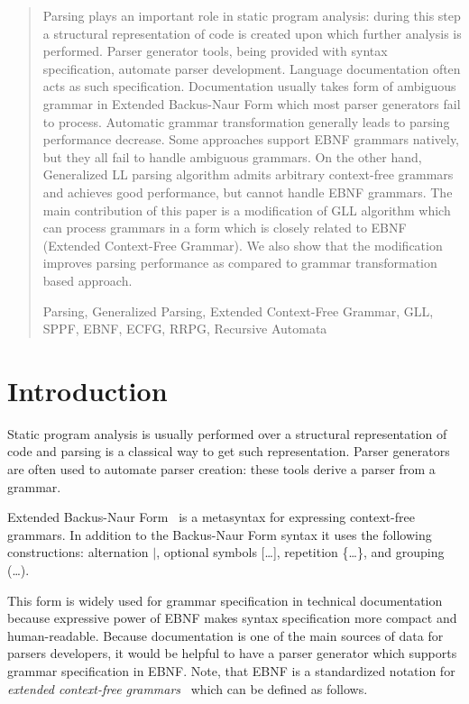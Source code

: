 \documentclass[runningheads,a4paper]{llncs}
\newcommand{\keywords}[1]{\par\addvspace\baselineskip
\noindent\keywordname\enspace\ignorespaces#1}
\begin{document}
\begin{abstract}
Parsing plays an important role in static program analysis: during this step a structural representation of code is created upon which further analysis is performed. 
Parser generator tools, being provided with syntax specification, automate parser development. 
Language documentation often acts as such specification. 
Documentation usually takes form of ambiguous grammar in Extended Backus-Naur Form which most parser generators fail to process. 
Automatic grammar transformation generally leads to parsing performance decrease. 
Some approaches support EBNF grammars natively, but they all fail to handle ambiguous grammars. 
On the other hand, Generalized LL parsing algorithm admits arbitrary context-free grammars and achieves good performance, but cannot handle EBNF grammars. 
The main contribution of this paper is a modification of GLL algorithm which can process grammars in a form which is closely related to EBNF (Extended Context-Free Grammar). 
We also show that the modification improves parsing performance as compared to grammar transformation based approach. 

\keywords{Parsing, Generalized Parsing, Extended Context-Free Grammar, GLL, SPPF, EBNF, ECFG, RRPG, Recursive Automata}
\end{abstract}


\section{Introduction}%

Static program analysis is usually performed over a structural representation of code and parsing is a classical way to get such representation.
Parser generators are often used to automate parser creation: these tools derive a parser from a grammar.

Extended Backus-Naur Form~\cite{EBNFISO} is a metasyntax for expressing context-free grammars. 
In addition to the Backus-Naur Form syntax it uses the following constructions: alternation $\mid$, optional symbols [\dots], repetition \{\dots\}, and grouping (\dots).

This form is widely used for grammar specification in technical documentation because expressive power of EBNF makes syntax specification more compact and human-readable. 
Because documentation is one of the main sources of data for parsers developers, it would be helpful to have a parser generator which supports grammar specification in EBNF.
Note, that EBNF is a standardized notation for \textit{extended context-free grammars}~\cite{ECFG} which can be defined as follows.
\end{document}
